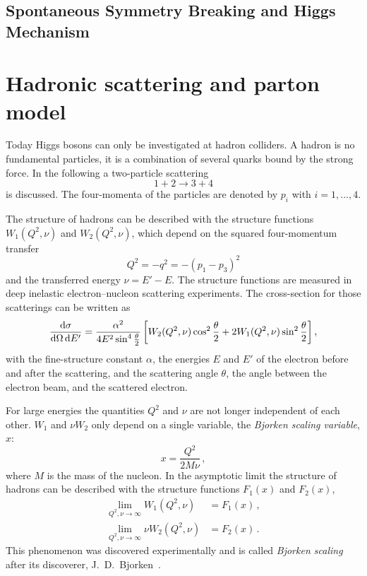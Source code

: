 \subsection{Spontaneous Symmetry Breaking and Higgs Mechanism}\label{sub:theory:sm:higgsmechanism}




\section{Hadronic scattering and parton model}\label{sec:theory:hadronscattering}

Today Higgs bosons can only be investigated at hadron colliders.
A hadron is no fundamental particles, it is a combination of several quarks bound by the strong force.
In the following a two-particle scattering
\begin{equation}
    1 + 2 \to 3 + 4
\end{equation}
is discussed.
The four-momenta of the particles are denoted by $p_i$ with $i = 1,\ldots,4$.

The structure of hadrons can be described with the structure functions $W_1(Q^2, \nu)$ and $W_2(Q^2, \nu)$,
which depend on the squared four-momentum transfer
\begin{equation}
    Q^2 = -q^2 = - (p_1 - p_3)^2
\end{equation}
and the transferred energy $\nu = E' - E$.
The structure functions are measured in deep inelastic electron--nucleon scattering experiments.
The cross-section for those scatterings can be written as~\cite{drell64, bjo:scaling}
\begin{equation}
    \frac{\dif \sigma}{\dif\Omega \dif E'} = \frac{\alpha^2}{4 E^2 \sin^4 \frac{\theta}{2}}
    \left[ W_2(Q^2, \nu) \cos^2 \frac{\theta}{2} + 2 W_1(Q^2, \nu) \sin^2 \frac{\theta}{2} \right ],
\end{equation}
with the fine-structure constant $\alpha$, the energies $E$ and $E'$ of the electron before and after the scattering,
and the scattering angle $\theta$, the angle between the electron beam, and the scattered electron.

For large energies the quantities $Q^2$ and $\nu$ are not longer independent of each other.
$W_1$ and $\nu W_2$ only depend on a single variable, the \emph{Bjorken scaling variable}, $x$:
\begin{equation}
    x = \frac{Q^2}{2 M \nu} \,,
\end{equation}
where $M$ is the mass of the nucleon.
In the asymptotic limit the structure of hadrons can be described with the structure functions $F_1(x)$ and $F_2(x)$,
\begin{equation}
    \begin{split}
        \lim_{Q^2, \nu \to \infty} W_1(Q^2, \nu) &= F_1(x) \,, \\
        \lim_{Q^2, \nu \to \infty} \nu W_2(Q^2, \nu) &= F_2(x) \,.
    \end{split}
\end{equation}
This phenomenon was discovered experimentally and is called \emph{Bjorken scaling} after its discoverer, J.\ D.\ Bjorken~\cite{bjo:scaling}.


